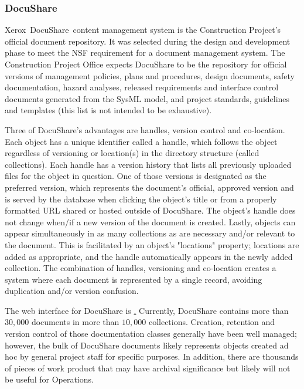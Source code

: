 \subsubsection{DocuShare}

Xerox\textregistered\ DocuShare\textregistered\ content management system \citep{DocuShare-cite} is the Construction Project's official document repository.
It was selected during the design and development phase to meet the NSF requirement for a document management system.
The Construction Project Office expects DocuShare to be the repository for official versions of management policies, plans and procedures, design documents, safety documentation, hazard analyses, released requirements and interface control documents generated from the SysML model, and project standards, guidelines and templates (this list is not intended to be exhaustive).

Three of DocuShare's advantages are handles, version control and co-location.
Each object has a unique identifier called a handle, which follows the object regardless of versioning or location(s) in the directory structure (called collections).
Each handle has a version history that lists all previously uploaded files for the object in question.
One of those versions is designated as the preferred version, which represents the document's official, approved version and is served by the database when clicking the object's title or from a properly formatted URL shared or hosted outside of DocuShare.
The object's handle does not change when/if a new version of the document is created.
Lastly, objects can appear simultaneously in as many collections as are necessary and/or relevant to the document.
This is facilitated by an object's "locations" property; locations are added as appropriate, and the handle automatically appears in the newly added collection.
The combination of handles, versioning and co-location creates a system where each document is represented by a single record, avoiding duplication and/or version confusion.

The web interface for DocuShare is \href{https://docushare.lsstcorp.org/docushare/dsweb/HomePage}.
Currently, DocuShare contains more than $30,000$ documents in more than $10,000$ collections.
Creation, retention and version control of those documentation classes generally have been well managed; however, the bulk of DocuShare documents likely represents objects created ad hoc by general project staff for specific purposes.
In addition, there are thousands of pieces of work product that may have archival significance but likely will not be useful for Operations.

